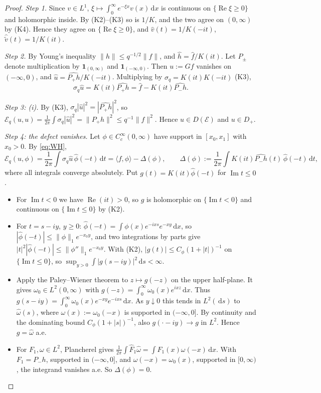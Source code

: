 \documentclass[11pt]{amsart}
\newcommand{\E}{\mathcal{E}}
\newcommand{\one}{\mathbf{1}}
\newcommand{\dd}{\,\mathrm{d}}
\DeclareMathOperator{\re}{Re}
\DeclareMathOperator{\im}{Im}
\theoremstyle{definition}
\theoremstyle{remark}
\numberwithin{equation}{section}
\begin{document}
\begin{proof}
\emph{Step 1.} Since $v\in L^1$, $\xi\mapsto\int_0^\infty e^{-\xi x}v(x)\dd x$ is continuous on $\{\re\xi\ge0\}$ and holomorphic inside. By (K2)--(K3) so is $1/K$, and the two agree on $(0,\infty)$ by (K4). Hence they agree on $\{\re\xi\ge0\}$, and $\hat v(t)=1/K(-it)$, $\hat{\tilde v}(t)=1/K(it)$.

\emph{Step 2.} By Young's inequality $\|h\|\le q^{-1/2}\|f\|$, and $\hat h=\hat f/K(it)$. Let $P_\pm$ denote multiplication by $\one_{(0,\infty)}$ and $\one_{(-\infty,0)}$. Then $u:=Gf$ vanishes on $(-\infty,0)$, and $\hat u=\widehat{P_+h}/K(-it)$. Multiplying by $\sigma_q=K(it)K(-it)$ (K3),
\begin{equation}\label{eq:WH}
\sigma_q\hat u=K(it)\widehat{P_+h}=\hat f-K(it)\widehat{P_-h}.
\end{equation}

\emph{Step 3: (i).} By (K3), $\sigma_q|\hat u|^2=|\widehat{P_+h}|^2$, so $\E_q(u,u)=\frac1{2\pi}\int\sigma_q|\hat u|^2=\|P_+h\|^2\le q^{-1}\|f\|^2$. Hence $u\in D(\E)$ and $u\in D_+$.

\emph{Step 4: the defect vanishes.} Let $\phi\in C_c^\infty(0,\infty)$ have support in $[x_0,x_1]$ with $x_0>0$. By \eqref{eq:WH},
\[
\E_q(u,\phi)=\frac1{2\pi}\int\sigma_q\hat u\,\hat\phi(-t)\dd t=\langle f,\phi\rangle-\Delta(\phi),\qquad \Delta(\phi):=\frac1{2\pi}\int K(it)\widehat{P_-h}(t)\,\hat\phi(-t)\dd t,
\]
where all integrals converge absolutely. Put $g(t)=K(it)\hat\phi(-t)$ for $\im t\le0$.
\begin{itemize}
\item For $\im t<0$ we have $\re(it)>0$, so $g$ is holomorphic on $\{\im t<0\}$ and continuous on $\{\im t\le0\}$ by (K2).
\item For $t=s-iy$, $y\ge0$: $\hat\phi(-t)=\int\phi(x)e^{-ixs}e^{-xy}\dd x$, so $|\hat\phi(-t)|\le\|\phi\|_1e^{-x_0y}$, and two integrations by parts give $|t|^2|\hat\phi(-t)|\le\|\phi''\|_1e^{-x_0y}$. With (K2), $|g(t)|\le C_\phi(1+|t|)^{-1}$ on $\{\im t\le0\}$, so $\sup_{y>0}\int|g(s-iy)|^2\dd s<\infty$.
\item Apply the Paley--Wiener theorem \cite[Thm.~19.2]{Rudin87} to $z\mapsto g(-z)$ on the upper half-plane. It gives $\omega_0\in L^2(0,\infty)$ with $g(-z)=\int_0^\infty\omega_0(x)e^{ixz}\dd x$. Thus $g(s-iy)=\int_0^\infty\omega_0(x)e^{-xy}e^{-ixs}\dd x$. As $y\downarrow0$ this tends in $L^2(\dd s)$ to $\hat\omega(s)$, where $\omega(x):=\omega_0(-x)$ is supported in $(-\infty,0]$. By continuity and the dominating bound $C_\phi(1+|s|)^{-1}$, also $g(\cdot-iy)\to g$ in $L^2$. Hence $g=\hat\omega$ a.e.
\item For $F_1,\omega\in L^2$, Plancherel gives $\frac1{2\pi}\int\hat F_1\hat\omega=\int F_1(x)\omega(-x)\dd x$. With $F_1=P_-h$, supported in $(-\infty,0]$, and $\omega(-x)=\omega_0(x)$, supported in $[0,\infty)$, the integrand vanishes a.e. So $\Delta(\phi)=0$.
\end{itemize}


\end{proof}
\end{document}
